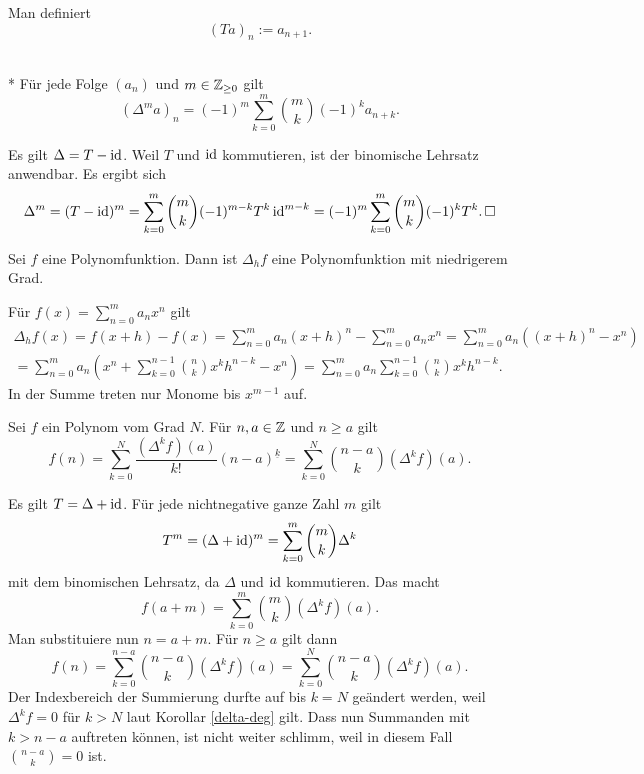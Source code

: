 \begin{Definition}[Shiftoperator] Man definiert
\[(Ta)_n := a_{n+1}.\]
\end{Definition}

\begin{Korollar}\mbox{}\\*
Für jede Folge $(a_n)$ und $m\in\mathbb Z_{\ge 0}$ gilt
\[(\Delta^m a)_n = (-1)^m\sum_{k=0}^m\binom{m}{k} (-1)^k a_{n+k}.\]
\end{Korollar}
\begin{Beweis} Es gilt $\Delta = T-\operatorname{id}$. Weil $T$ und $\operatorname{id}$ kommutieren,
ist der binomische Lehrsatz anwendbar. Es ergibt sich
\[\Delta^m = (T-\operatorname{id})^m = \sum_{k=0}^m\binom{m}{k} (-1)^{m-k} T^k\operatorname{id}^{m-k}
= (-1)^m \sum_{k=0}^m\binom{m}{k} (-1)^k T^k.\,\square\]
\end{Beweis}

\begin{Korollar}\label{delta-deg}
Sei $f$ eine Polynomfunktion. Dann ist $\Delta_h f$ eine
Polynomfunktion mit niedrigerem Grad.
\end{Korollar}
\begin{Beweis} Für $f(x)=\sum_{n=0}^m a_n x^n$ gilt
\begin{gather*}
\Delta_h f(x) = f(x+h) - f(x) = \sum_{n=0}^m a_n (x+h)^n - \sum_{n=0}^m a_n x^n
= \sum_{n=0}^m a_n ((x+h)^n - x^n)\\
= \sum_{n=0}^m a_n (x^n + \sum_{k=0}^{n-1}\binom{n}{k}x^k h^{n-k} - x^n)
= \sum_{n=0}^m a_n \sum_{k=0}^{n-1}\binom{n}{k}x^k h^{n-k}.
\end{gather*}
In der Summe treten nur Monome bis $x^{m-1}$ auf.\,\qedsymbol
\end{Beweis}

\begin{Satz} Sei $f$ ein Polynom vom Grad $N$. Für $n,a\in\mathbb Z$ und $n\ge a$ gilt
\[f(n) = \sum_{k=0}^N \frac{(\Delta^k f)(a)}{k!}(n-a)^{\underline k}
= \sum_{k=0}^N \binom{n-a}{k}(\Delta^k f)(a).\]
\end{Satz}
\begin{Beweis}
Es gilt $T=\Delta+\operatorname{id}$. Für jede nichtnegative ganze Zahl $m$ gilt
\[T^m = (\Delta+\operatorname{id})^m = \sum_{k=0}^m\binom{m}{k}\Delta^k\]
mit dem binomischen Lehrsatz, da $\Delta$ und $\operatorname{id}$ kommutieren. Das macht
\[f(a + m) = \sum_{k=0}^m\binom{m}{k}(\Delta^k f)(a).\]
Man substituiere nun $n = a+m$. Für $n\ge a$ gilt dann
\[f(n) = \sum_{k=0}^{n-a}\binom{n-a}{k}(\Delta^k f)(a)
= \sum_{k=0}^N\binom{n-a}{k}(\Delta^k f)(a).\]
Der Indexbereich der Summierung durfte auf bis $k=N$ geändert werden, weil
$\Delta^k f = 0$ für $k>N$ laut Korollar \ref{delta-deg} gilt. Dass nun
Summanden mit $k>n-a$ auftreten können, ist nicht weiter schlimm, weil
in diesem Fall $\binom{n-a}{k}=0$ ist.\,\qedsymbol
\end{Beweis}

